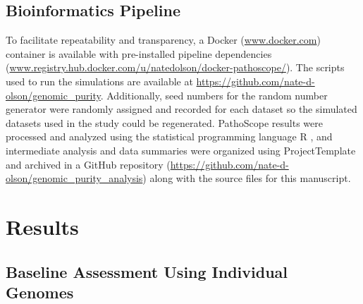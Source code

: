 \documentclass[fleqn,10pt,lineno]{wlpeerj}\usepackage[]{graphicx}\usepackage[]{color}
\begin{document}
\subsection*{Bioinformatics Pipeline}

To facilitate repeatability and transparency, a Docker (\url{www.docker.com}) container is available
with pre-installed pipeline dependencies (\url{www.registry.hub.docker.com/u/natedolson/docker-pathoscope/}).
The scripts used to run the simulations are available at \url{https://github.com/nate-d-olson/genomic_purity}.
Additionally, seed numbers for the random number generator were randomly assigned and recorded for each dataset so the simulated datasets used in the study could be regenerated.
PathoScope results were processed and analyzed using the statistical programming language R \citep{R}, and intermediate analysis and data summaries were organized using ProjectTemplate \citep{ProjectTemplate} and archived in a GitHub repository (\url{https://github.com/nate-d-olson/genomic_purity_analysis}) along with the source files for this manuscript. 


\section*{Results}

\subsection*{Baseline Assessment Using Individual Genomes}
\end{document}
